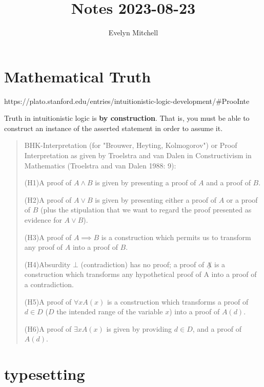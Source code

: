 \documentclass[]{scrartcl}
\title{Notes 2023-08-23}
\author{Evelyn Mitchell}
\begin{document}
\maketitle

\begin{abstract}

\end{abstract}

\section{Mathematical Truth}

https://plato.stanford.edu/entries/intuitionistic-logic-development/\#ProoInte

Truth in intuitionistic logic is \textbf{by construction}. That is, you must be able to construct an instance of the asserted statement in order to assume it.

\begin{quote}
BHK-Interpretation (for "Brouwer, Heyting, Kolmogorov") or Proof Interpretation as given by Troelstra and van Dalen in Constructivism in Mathematics (Troelstra and van Dalen 1988: 9):

(H1)A proof of $A \land B$ is given by presenting a proof of $A$ and a proof of $B$. 

(H2)A proof of $A \lor B$ is given by presenting either a proof of $A$ or a proof of $B$ (plus the stipulation that we want to regard the proof presented as evidence for $A \lor B$). 

(H3)A proof of $A \implies B$ is a construction which permits us to transform any proof of $A$ into a proof of $B$. 

(H4)Absurdity $\bot$ (contradiction) has no proof; a proof of $\not A$ is a construction which transforms any hypothetical proof of A into a proof of a contradiction. 

(H5)A proof of $\forall xA(x)$ is a construction which transforms a proof of $d \in D$ ($D$ the intended range of the variable $x$) into a proof of $A(d)$. 

(H6)A proof of $\exists xA(x)$ is given by providing $d \in D$, and a proof of $A(d)$.
\end{quote}

\section{typesetting}
\end{document}
